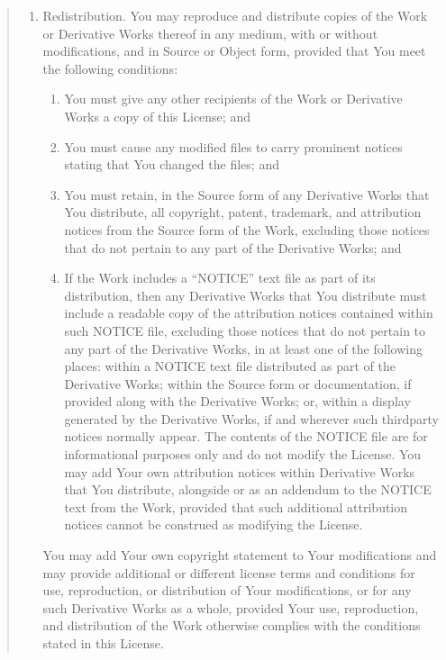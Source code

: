 \documentclass[letterpaper,10pt,english,openany,oneside]{sphinxmanual}
\begin{document}
\begin{quote}
\begin{enumerate}
\item {} 
\sphinxAtStartPar
Redistribution. You may reproduce and distribute copies of the
Work or Derivative Works thereof in any medium, with or without
modifications, and in Source or Object form, provided that You
meet the following conditions:
\begin{enumerate}
%
\item {} 
\sphinxAtStartPar
You must give any other recipients of the Work or
Derivative Works a copy of this License; and

\item {} 
\sphinxAtStartPar
You must cause any modified files to carry prominent notices
stating that You changed the files; and

\item {} 
\sphinxAtStartPar
You must retain, in the Source form of any Derivative Works
that You distribute, all copyright, patent, trademark, and
attribution notices from the Source form of the Work,
excluding those notices that do not pertain to any part of
the Derivative Works; and

\item {} 
\sphinxAtStartPar
If the Work includes a “NOTICE” text file as part of its
distribution, then any Derivative Works that You distribute must
include a readable copy of the attribution notices contained
within such NOTICE file, excluding those notices that do not
pertain to any part of the Derivative Works, in at least one
of the following places: within a NOTICE text file distributed
as part of the Derivative Works; within the Source form or
documentation, if provided along with the Derivative Works; or,
within a display generated by the Derivative Works, if and
wherever such third\sphinxhyphen{}party notices normally appear. The contents
of the NOTICE file are for informational purposes only and
do not modify the License. You may add Your own attribution
notices within Derivative Works that You distribute, alongside
or as an addendum to the NOTICE text from the Work, provided
that such additional attribution notices cannot be construed
as modifying the License.

\end{enumerate}

\sphinxAtStartPar
You may add Your own copyright statement to Your modifications and
may provide additional or different license terms and conditions
for use, reproduction, or distribution of Your modifications, or
for any such Derivative Works as a whole, provided Your use,
reproduction, and distribution of the Work otherwise complies with
the conditions stated in this License.


\end{enumerate}
\end{quote}
\end{document}
